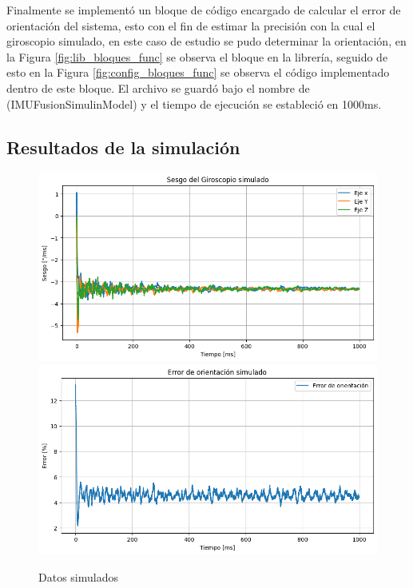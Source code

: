 Finalmente se implementó un bloque de código encargado de calcular el error de orientación del sistema, esto con el fin de estimar la precisión con la cual el giroscopio simulado, en este caso de estudio se pudo determinar la orientación, en la Figura \ref{fig:lib_bloques_func} se observa el bloque en la librería, seguido de esto en la Figura \ref{fig:config_bloques_func} se observa el código implementado dentro de este bloque. El archivo se guardó bajo el nombre de (IMUFusionSimulinModel) y el tiempo de ejecución se estableció en 1000ms. 
\newpage

\subsection{Resultados de la simulación}\label{subsub:resultados_simulados_IMU}

\begin{figure}[htbp]
    \centering
    \includegraphics[scale=0.3]{fig/Capitulo5/Caso_de_estudio_IMU/data/simulated/sesgo_simulado.png}
    \vspace{1cm}
    \includegraphics[scale=0.3]{fig/Capitulo5/Caso_de_estudio_IMU/data/simulated/error_de_orientacion_simulado.png}
    \caption{Datos simulados}
    \label{fig:data_simulated}
\end{figure}

